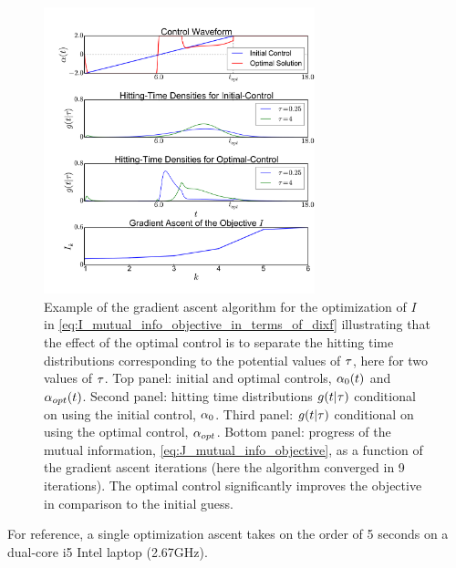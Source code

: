 \documentclass[12pt]{article}
\begin{document}
\begin{figure}[htp] 
\begin{center}
\includegraphics[width=0.7\textwidth]{Figs/AdjointOptimizer/GradientAscent_Nt2.pdf}
\caption[Gradient Ascent for the Optimal Stimulation]{Example of the
    gradient ascent algorithm for the optimization of $I$ in 
  \cref{eq:I_mutual_info_objective_in_terms_of_dixf} illustrating that the
  effect of the optimal control is to separate the
  hitting time distributions corresponding to the potential values of
  ${ \tau }$, here for two values of ${ \tau }$. 
  Top
  panel: initial and optimal controls, ${\alpha}_{0}(t)$ and
  ${\alpha}_{opt}(t)$. Second panel: hitting time distributions $g(t|{ \tau })$ 
  conditional on 
  using the initial control, ${\alpha}_0$.
  Third panel: $g(t|{ \tau })$ conditional on using the
  optimal control, ${\alpha}_{opt}$.
 Bottom panel: progress of the mutual information,  
  \cref{eq:J_mutual_info_objective}, as a function of the gradient ascent
  iterations (here the algorithm converged in 9 iterations). The
  optimal control significantly improves the objective in comparison
  to the 
  initial guess.}
  \label{fig:example_gradient_ascent}   
\end{center}   
\end{figure} 

For reference, a single optimization ascent takes on the order of 5
seconds on a dual-core i5 Intel laptop (2.67GHz). 
 
\
\end{document}
